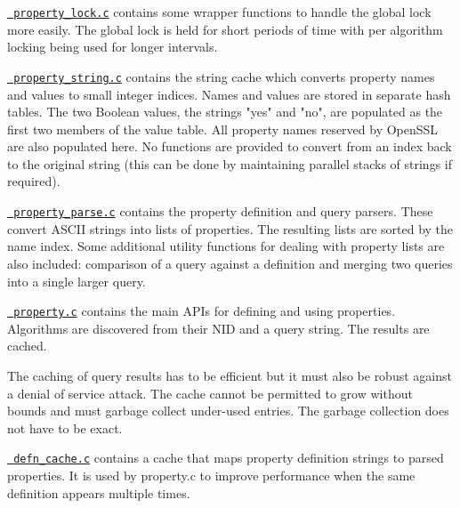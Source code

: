 \begin{DoxyItemize}
\item \href{property_lock.c}{\texttt{ property\+\_\+lock.\+c}} contains some wrapper functions to handle the global lock more easily. The global lock is held for short periods of time with per algorithm locking being used for longer intervals.
\item \href{property_string.c}{\texttt{ property\+\_\+string.\+c}} contains the string cache which converts property names and values to small integer indices. Names and values are stored in separate hash tables. The two Boolean values, the strings "{}yes"{} and "{}no"{}, are populated as the first two members of the value table. All property names reserved by Open\+SSL are also populated here. No functions are provided to convert from an index back to the original string (this can be done by maintaining parallel stacks of strings if required).
\item \href{property_parse.c}{\texttt{ property\+\_\+parse.\+c}} contains the property definition and query parsers. These convert ASCII strings into lists of properties. The resulting lists are sorted by the name index. Some additional utility functions for dealing with property lists are also included\+: comparison of a query against a definition and merging two queries into a single larger query.
\item \href{property.c}{\texttt{ property.\+c}} contains the main APIs for defining and using properties. Algorithms are discovered from their NID and a query string. The results are cached.

The caching of query results has to be efficient but it must also be robust against a denial of service attack. The cache cannot be permitted to grow without bounds and must garbage collect under-\/used entries. The garbage collection does not have to be exact.
\item \href{defn_cache.c}{\texttt{ defn\+\_\+cache.\+c}} contains a cache that maps property definition strings to parsed properties. It is used by property.\+c to improve performance when the same definition appears multiple times. 
\end{DoxyItemize}